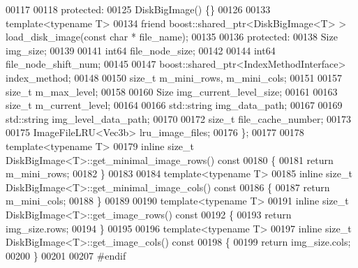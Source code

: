 \begin{DoxyCode}
00117 
00118 \textcolor{keyword}{protected}:
00125         DiskBigImage() \{\}
00126         
00133         \textcolor{keyword}{template}<\textcolor{keyword}{typename} T>
00134         \textcolor{keyword}{friend} boost::shared\_ptr<DiskBigImage<T> > load_disk_image(\textcolor{keyword}{const} \textcolor{keywordtype}{char} *
      file\_name);
00135 
00136 \textcolor{keyword}{protected}:
00138         Size img_size;
00139 
00141         int64 file_node_size;
00142 
00144         int64 file_node_shift_num;
00145 
00147         boost::shared\_ptr<IndexMethodInterface> index_method;
00148 
00150         \textcolor{keywordtype}{size\_t} m_mini_rows, m\_mini\_cols;
00151 
00157         \textcolor{keywordtype}{size\_t} m_max_level;
00158 
00160         Size img_current_level_size;
00161 
00163         \textcolor{keywordtype}{size\_t} m_current_level;
00164 
00166         std::string img_data_path;
00167 
00169         std::string img_level_data_path;
00170 
00172         \textcolor{keywordtype}{size\_t} file_cache_number;
00173 
00175         ImageFileLRU<Vec3b> lru_image_files;
00176 \};
00177 
00178 \textcolor{keyword}{template}<\textcolor{keyword}{typename} T>
00179 \textcolor{keyword}{inline} \textcolor{keywordtype}{size\_t} DiskBigImage<T>::get_minimal_image_rows()\textcolor{keyword}{ const }
00180 \textcolor{keyword}{}\{
00181         \textcolor{keywordflow}{return} m\_mini\_rows;
00182 \}
00183 
00184 \textcolor{keyword}{template}<\textcolor{keyword}{typename} T>
00185 \textcolor{keyword}{inline} \textcolor{keywordtype}{size\_t} DiskBigImage<T>::get_minimal_image_cols()\textcolor{keyword}{ const }
00186 \textcolor{keyword}{}\{
00187         \textcolor{keywordflow}{return} m\_mini\_cols;
00188 \}
00189 
00190 \textcolor{keyword}{template}<\textcolor{keyword}{typename} T>
00191 \textcolor{keyword}{inline} \textcolor{keywordtype}{size\_t} DiskBigImage<T>::get_image_rows()\textcolor{keyword}{ const}
00192 \textcolor{keyword}{}\{
00193         \textcolor{keywordflow}{return} img\_size.rows;
00194 \}
00195 
00196 \textcolor{keyword}{template}<\textcolor{keyword}{typename} T>
00197 \textcolor{keyword}{inline} \textcolor{keywordtype}{size\_t} DiskBigImage<T>::get_image_cols()\textcolor{keyword}{ const}
00198 \textcolor{keyword}{}\{
00199         \textcolor{keywordflow}{return} img\_size.cols;
00200 \}
00201 
00207 \textcolor{preprocessor}{#endif}
\end{DoxyCode}
